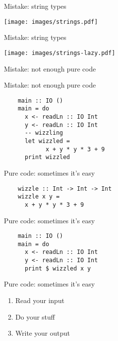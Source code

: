 \documentclass[20pt]{beamer}
\newcommand{\chapterslide}[1]{
    {
        \begin{frame}[plain]
        \begin{center}
        \large{#1}
        \end{center}
        \end{frame}
    }
}
\begin{document}
\begin{frame}{Mistake: string types}
    \begin{center}
    \texttt{[image: images/strings.pdf]}
    \end{center}
\end{frame}

\begin{frame}{Mistake: string types}
    \begin{center}
    \texttt{[image: images/strings-lazy.pdf]}
    \end{center}
\end{frame}


\chapterslide{Mistake: not enough pure code}

\begin{frame}[fragile]{Mistake: not enough pure code}
    \begin{lstlisting}
    main :: IO ()
    main = do
      x <- readLn :: IO Int
      y <- readLn :: IO Int
      -- wizzling
      let wizzled =
            x + y * y * 3 + 9
      print wizzled
    \end{lstlisting}
\end{frame}

\begin{frame}[fragile]{Pure code: sometimes it's easy}
    \begin{lstlisting}
    wizzle :: Int -> Int -> Int
    wizzle x y =
      x + y * y * 3 + 9
    \end{lstlisting}
\end{frame}

\begin{frame}[fragile]{Pure code: sometimes it's easy}
    \begin{lstlisting}
    main :: IO ()
    main = do
      x <- readLn :: IO Int
      y <- readLn :: IO Int
      print $ wizzled x y
    \end{lstlisting}
\end{frame}

\begin{frame}{Pure code: sometimes it's easy}
    \begin{enumerate}
    \item Read your input
    \item Do your stuff
    \item Write your output
    \end{enumerate}
\end{frame}
\end{document}
